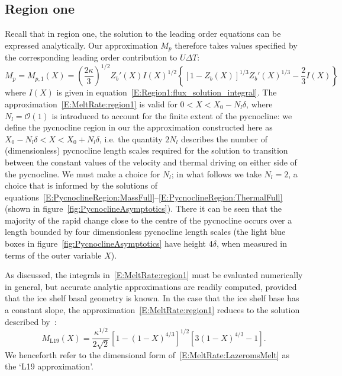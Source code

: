 \documentclass[openacc]{rsproca_new}%
\newcommand{\order}[1]{\mathcal{O}(#1)}
\newcommand{\lt}{\delta} %
\begin{document}
\subsection{Region one}
Recall that in region one, the solution to the leading order equations can be expressed analytically. Our approximation $M_p$ therefore takes values specified by the corresponding leading order contribution to $U\Delta T$:
\begin{equation}\label{E:MeltRate:region1}
M_{p} = M_{p,1}(X) = \left(\frac{2\kappa}{3}\right)^{1/2}Z_b'(X)I(X)^{1/2}\left\{\left[1 - Z_b(X)\right]^{1/3}Z_b'(X)^{1/3} - \frac{2}{3}I(X) \right\} %
\end{equation}
where $I(X)$ is given in equation~\eqref{E:Region1:flux_solution_integral}. The approximation~\eqref{E:MeltRate:region1} is valid for $0 < X < X_0 - N_l \lt $, where $N_l = \order{1}$ is introduced to account for the finite extent of the pycnocline: we define the pycnocline region in our the approximation constructed here as $X_0 - N_l \lt < X < X_0 + N_l \lt$, i.e. the quantity $2 N_l$ describes the number of (dimensionless) pycnocline length scales required for the solution to transition between the constant values of the velocity and thermal driving on either side of the pycnocline.  We must make a choice for $N_l$; in what follows we take $N_l = 2$, a choice that is informed by the solutions of equations~\eqref{E:PycnoclineRegion:MassFull}--\eqref{E:PycnoclineRegion:ThermalFull} (shown in figure~\ref{fig:PycnoclineAsymptotics}). There it can be seen that the majority of the rapid change close to the centre of the pycnocline occurs over a length bounded by four dimensionless pycnocline length scales (the light blue boxes in figure~\ref{fig:PycnoclineAsymptotics} have height $4\lt$, when measured in terms of the outer variable $X$).

As discussed, the integrals in~\eqref{E:MeltRate:region1} must be evaluated numerically in general, but accurate analytic approximations are readily computed, provided that the ice shelf basal geometry is known. In the case that the ice shelf base has a constant slope, the approximation~\eqref{E:MeltRate:region1} reduces to the solution described by~\citet{Lazeroms2019JPhysOcean}:
\begin{equation}\label{E:MeltRate:LazeromsMelt}
M_{\text{L19}}(X) = \frac{\kappa^{1/2}}{2\sqrt{2}}\left[1 - (1 - X)^{4/3}\right]^{1/2}\left[3(1-X)^{4/3} - 1\right].
\end{equation}
We henceforth refer to the dimensional form of~\eqref{E:MeltRate:LazeromsMelt} as the `L19 approximation'. 
\end{document}
